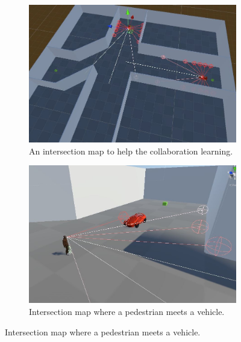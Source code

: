 \begin{figure}[!htbp] 
\centering
\begin{minipage}[t]{.45\textwidth}
\centering
\begin{subfigure}{\textwidth}
        \includegraphics[width=\linewidth, left]{06_Implementation/00_MLAgents/Images/MLMap3.JPG}
        \caption[Training environment map 3]{An intersection map to help the collaboration learning. }
        \label{06:fig:MLMap3}
    \end{subfigure}
\end{minipage}
\qquad
\begin{minipage}[t]{.45\textwidth}
    \centering
    \begin{subfigure}{\textwidth}
        \includegraphics[width=\linewidth, right]{06_Implementation/00_MLAgents/Images/MLMap4.JPG}
        \caption[Training pedestrians]{Intersection map where a pedestrian meets a vehicle.}
        \label{06:fig:MLMap4}
    \end{subfigure}
\end{minipage}
\end{figure}



